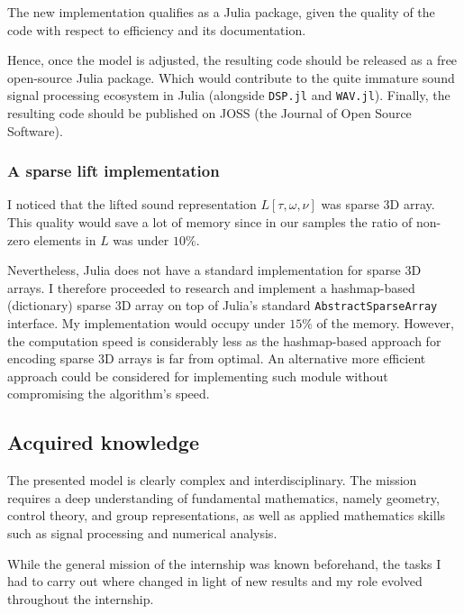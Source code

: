 \documentclass[american,]{article}
\theoremstyle{definition}
\theoremstyle{definition}
\theoremstyle{definition}
\theoremstyle{remark}
\begin{document}
The new implementation qualifies as a Julia package,
given the quality of the code with respect to efficiency and its documentation.

Hence, once the model is adjusted, the resulting code should be released
as a free open-source Julia package.
Which would contribute to the quite immature sound signal processing ecosystem
in Julia (alongside \texttt{DSP.jl} and \texttt{WAV.jl}).
Finally, the resulting code should be published on JOSS (the Journal of Open Source Software).

\hypertarget{a-sparse-lift-implementation}{%
\subsubsection{A sparse lift implementation}\label{a-sparse-lift-implementation}}

I noticed that the lifted sound representation \(L[\tau,\omega,\nu]\) was sparse 3D array.
This quality would save a lot of memory since in our samples the ratio of non-zero
elements in \(L\) was under \(10\%\).

Nevertheless, Julia does not have a standard implementation for sparse 3D arrays.
I therefore proceeded to research and implement a hashmap-based (dictionary) sparse 3D array
on top of Julia's standard \texttt{AbstractSparseArray} interface.
My implementation would occupy under \(15\%\) of the memory.
However, the computation speed is considerably less as the hashmap-based approach
for encoding sparse 3D arrays is far from optimal.
An alternative more efficient approach could be considered for implementing such module
without compromising the algorithm's speed.

\hypertarget{acquired-knowledge}{%
\subsection{Acquired knowledge}\label{acquired-knowledge}}

The presented model is clearly complex and interdisciplinary.
The mission requires a deep understanding of fundamental mathematics,
namely geometry, control theory, and group representations,
as well as applied mathematics skills such as
signal processing and numerical analysis.

While the general mission of the internship was known beforehand,
the tasks I had to carry out where changed in light of new results
and my role evolved throughout the internship.
\end{document}
